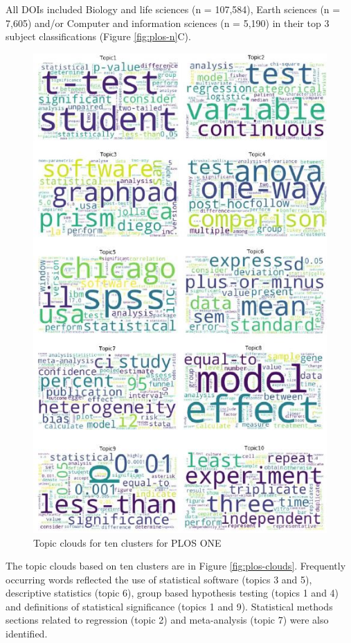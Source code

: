 \documentclass[12pt]{article}
\begin{document}
All DOIs included Biology and life sciences (n = 107,584), Earth
sciences (n = 7,605) and/or Computer and information sciences (n =
5,190) in their top 3 subject classifications (Figure
\ref{fig:plos-n}C).

\begin{figure}

{\centering \includegraphics[width=0.8\linewidth]{figures/plos.wordclouds} 

}

\caption{\label{fig:plos-clouds}Topic clouds for ten clusters for PLOS ONE}\label{fig:unnamed-chunk-5}
\end{figure}

The topic clouds based on ten clusters are in Figure
\ref{fig:plos-clouds}. Frequently occurring words reflected the use of
statistical software (topics 3 and 5), descriptive statistics (topic 6),
group based hypothesis testing (topics 1 and 4) and definitions of
statistical significance (topics 1 and 9). Statistical methods sections
related to regression (topic 2) and meta-analysis (topic 7) were also
identified.
\end{document}
